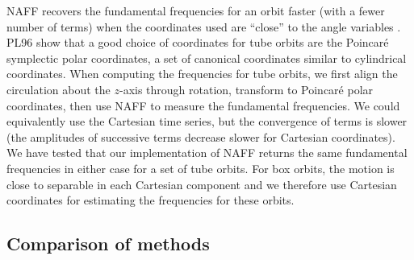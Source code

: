 \documentclass[letterpaper,12pt,preprint]{aastex}
\begin{document}

NAFF recovers the fundamental frequencies for an orbit faster (with a fewer number of terms) when the coordinates used are ``close'' to the angle variables \cite[PL96;][]{papaphilippou96}. PL96 show that a good choice of coordinates for tube orbits are the Poincar\'e symplectic polar coordinates, a set of canonical coordinates similar to cylindrical coordinates. When computing the frequencies for tube orbits, we first align the circulation about the $z$-axis through rotation, transform to Poincar\'e polar coordinates, then use NAFF to measure the fundamental frequencies. We could equivalently use the Cartesian time series, but the convergence of terms is slower (the amplitudes of successive terms decrease slower for Cartesian coordinates). We have tested that our implementation of NAFF returns the same fundamental frequencies in either case for a set of tube orbits. For box orbits, the motion is close to separable in each Cartesian component and we therefore use Cartesian coordinates for estimating the frequencies for these orbits.

\subsection{Comparison of methods}\label{sec:comparison}

\end{document}
